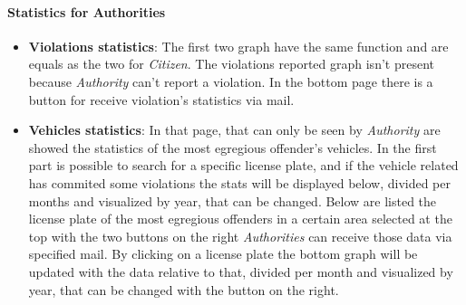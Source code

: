 \documentclass{article}
\begin{document}
\clearpage

\paragraph{Statistics for Authorities}
\begin{itemize}
    \item \textbf{Violations statistics}: The first two graph have the same function and are equals as the 
    two for \textit{Citizen}. The violations reported graph isn't present because \textit{Authority} can't 
    report a violation. In the bottom page there is a button for receive violation's statistics via mail.
    \item \textbf{Vehicles statistics}: In that page, that can only be seen by \textit{Authority} are showed 
    the statistics of the most egregious offender's vehicles. In the first part is possible to search for a 
    specific license plate, and if the vehicle related has commited some violations the stats will be displayed 
    below, divided per months and visualized by year, that can be changed.  Below are listed the license plate 
    of the most egregious offenders in a certain area selected at the top with the two buttons on the 
    right \textit{Authorities} can receive those data via specified mail. By clicking on a license plate 
    the bottom graph will be updated with the data relative to that, divided per month and visualized by year, 
    that can be changed with the button on the right.
\end{itemize}
\end{document}
